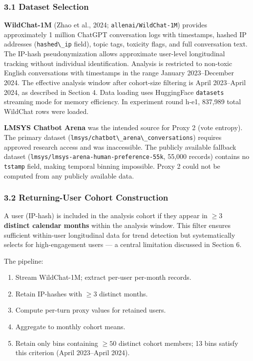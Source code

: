 
\subsubsection{3.1 Dataset Selection}

\textbf{WildChat-1M} (Zhao et al., 2024; \texttt{allenai/WildChat-1M}) provides approximately 1 million ChatGPT conversation logs with timestamps, hashed IP addresses (\texttt{hashed\textbackslash \_ip} field), topic tags, toxicity flags, and full conversation text. The IP-hash pseudonymization allows approximate user-level longitudinal tracking without individual identification. Analysis is restricted to non-toxic English conversations with timestamps in the range January 2023--December 2024. The effective analysis window after cohort-size filtering is April 2023--April 2024, as described in Section 4. Data loading uses HuggingFace \texttt{datasets} streaming mode for memory efficiency. In experiment round h-e1, 837,989 total WildChat rows were loaded.

\textbf{LMSYS Chatbot Arena} \citep{Zheng2023Judging} was the intended source for Proxy 2 (vote entropy). The primary dataset (\texttt{lmsys/chatbot\textbackslash \_arena\textbackslash \_conversations}) requires approved research access and was inaccessible. The publicly available fallback dataset (\texttt{lmsys/lmsys-arena-human-preference-55k}, 55,000 records) contains no \texttt{tstamp} field, making temporal binning impossible. Proxy 2 could not be computed from any publicly available data.

\subsubsection{3.2 Returning-User Cohort Construction}

A user (IP-hash) is included in the analysis cohort if they appear in \textbf{$\geq 3$ distinct calendar months} within the analysis window. This filter ensures sufficient within-user longitudinal data for trend detection but systematically selects for high-engagement users --- a central limitation discussed in Section 6.

The pipeline:

\begin{enumerate}
\item Stream WildChat-1M; extract per-user per-month records.
\item Retain IP-hashes with $\geq 3$ distinct months.
\item Compute per-turn proxy values for retained users.
\item Aggregate to monthly cohort means.
\item Retain only bins containing $\geq 50$ distinct cohort members; 13 bins satisfy this criterion (April 2023--April 2024).
\end{enumerate}

